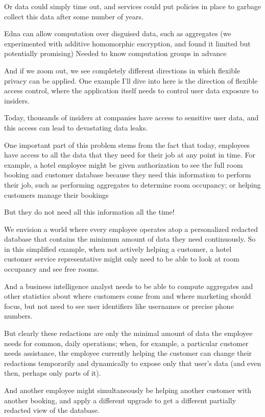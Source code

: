 Or data could simply time out, and services could put policies in place to garbage collect this data after some number of years.


Edna can allow computation over disguised data, such as aggregates (we experimented with additive homomorphic encryption, and found it limited but potentially promising)
Needed to know computation groups in advance

And if we zoom out, we see completely different directions in which flexible privacy can be applied. One example I’ll dive into here is the direction of flexible access control, where the application itself needs to control user data exposure to insiders.

Today, thousands of insiders at companies have access to sensitive user data, and this access can lead to devastating data leaks.

One important part of this problem stems from the fact that today, employees have access to all the data that they need for their job at any point in time. For example, a hotel employee might be given authorization to see the full room booking and customer database because they need this information to perform their job, such as performing aggregates to determine room occupancy; or helping customers manage their bookings

But they do not need all this information all the time!


We envision a world where every employee operates atop a personalized redacted database that contains the minimum amount of data they need continuously. So in this simplified example, when not actively helping a customer, a hotel customer service representative might only need to be able to look at room occupancy and see free rooms.

And a business intelligence analyst needs to be able to compute aggregates and other statistics about where customers come from and where marketing should focus, but not need to see user identifiers like usernames or precise phone numbers.


But clearly these redactions are only the minimal amount of data the employee needs for common, daily operations; when, for example, a particular customer needs assistance, the employee currently helping the customer can change their redactions temporarily and dynamically to expose only that user’s data (and even then, perhaps only parts of it).

And another employee might simultaneously be helping another customer with another booking, and apply a different upgrade to get a different partially redacted view of the database.

